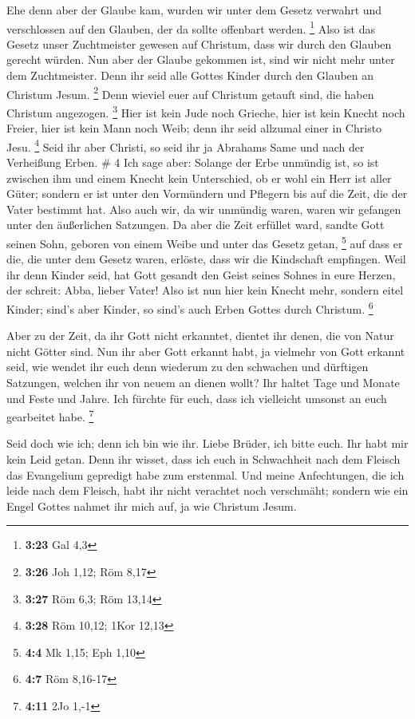  Ehe denn aber der Glaube kam, wurden wir unter dem
Gesetz verwahrt und verschlossen auf den Glauben, der da sollte
offenbart werden. \footnote{\textbf{3:23} Gal 4,3}  Also
ist das Gesetz unser Zuchtmeister gewesen auf Christum, dass wir durch
den Glauben gerecht würden.  Nun aber der Glaube gekommen
ist, sind wir nicht mehr unter dem Zuchtmeister.  Denn
ihr seid alle Gottes Kinder durch den Glauben an Christum Jesum.
\footnote{\textbf{3:26} Joh 1,12; Röm 8,17}  Denn wieviel
euer auf Christum getauft sind, die haben Christum angezogen.
\footnote{\textbf{3:27} Röm 6,3; Röm 13,14}  Hier ist
kein Jude noch Grieche, hier ist kein Knecht noch Freier, hier ist kein
Mann noch Weib; denn ihr seid allzumal einer in Christo Jesu.
\footnote{\textbf{3:28} Röm 10,12; 1Kor 12,13}  Seid ihr
aber Christi, so seid ihr ja Abrahams Same und nach der Verheißung
Erben. \# 4  Ich sage aber: Solange der Erbe unmündig ist,
so ist zwischen ihm und einem Knecht kein Unterschied, ob er wohl ein
Herr ist aller Güter;  sondern er ist unter den Vormündern
und Pflegern bis auf die Zeit, die der Vater bestimmt hat.
 Also auch wir, da wir unmündig waren, waren wir gefangen
unter den äußerlichen Satzungen.  Da aber die Zeit
erfüllet ward, sandte Gott seinen Sohn, geboren von einem Weibe und
unter das Gesetz getan, \footnote{\textbf{4:4} Mk 1,15; Eph 1,10}
 auf dass er die, die unter dem Gesetz waren, erlöste,
dass wir die Kindschaft empfingen.  Weil ihr denn Kinder
seid, hat Gott gesandt den Geist seines Sohnes in eure Herzen, der
schreit: Abba, lieber Vater!  Also ist nun hier kein
Knecht mehr, sondern eitel Kinder; sind's aber Kinder, so sind's auch
Erben Gottes durch Christum. \footnote{\textbf{4:7} Röm 8,16-17}

 Aber zu der Zeit, da ihr Gott nicht erkanntet, dientet
ihr denen, die von Natur nicht Götter sind.  Nun ihr aber
Gott erkannt habt, ja vielmehr von Gott erkannt seid, wie wendet ihr
euch denn wiederum zu den schwachen und dürftigen Satzungen, welchen ihr
von neuem an dienen wollt?  Ihr haltet Tage und Monate
und Feste und Jahre.  Ich fürchte für euch, dass ich
vielleicht umsonst an euch gearbeitet habe. \footnote{\textbf{4:11} 2Jo
  1,-1}

 Seid doch wie ich; denn ich bin wie ihr. Liebe Brüder,
ich bitte euch. Ihr habt mir kein Leid getan.  Denn ihr
wisset, dass ich euch in Schwachheit nach dem Fleisch das Evangelium
gepredigt habe zum erstenmal.  Und meine Anfechtungen,
die ich leide nach dem Fleisch, habt ihr nicht verachtet noch
verschmäht; sondern wie ein Engel Gottes nahmet ihr mich auf, ja wie
Christum Jesum.

